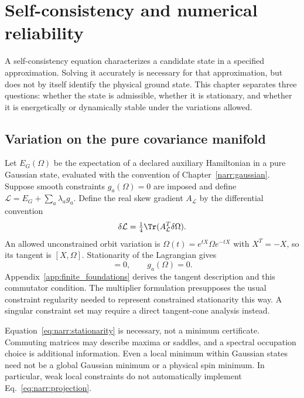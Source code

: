 \chapter{Self-consistency and numerical reliability}
\label{narr:variation}

A self-consistency equation characterizes a candidate state in a specified
approximation. Solving it accurately is necessary for that approximation, but
does not by itself identify the physical ground state. This chapter separates
three questions: whether the state is admissible, whether it is stationary, and
whether it is energetically or dynamically stable under the variations allowed.

\section{Variation on the pure covariance manifold}
Let $E_G(\Omega)$ be the expectation of a declared auxiliary Hamiltonian in a
pure Gaussian state, evaluated with the convention of Chapter~\ref{narr:gaussian}.
Suppose smooth constraints $g_a(\Omega)=0$ are imposed and define
$\mathcal L=E_G+\sum_a\lambda_ag_a$. Define the real skew gradient $A_{\mathcal L}$
by the differential convention
\begin{equation}
 \delta\mathcal L=\tfrac14\Tr(A_{\mathcal L}^T\delta\Omega).
 \label{eq:narr:gradient}
\end{equation}
An allowed unconstrained orbit variation is
$\Omega(t)=e^{tX}\Omega e^{-tX}$ with $X^T=-X$, so its tangent is $[X,\Omega]$.
Stationarity of the Lagrangian gives
\begin{equation}
 [A_{\mathcal L},\Omega]=0,\qquad g_a(\Omega)=0.
 \label{eq:narr:stationarity}
\end{equation}
Appendix~\ref{app:finite_foundations} derives the tangent description and this
commutator condition. The multiplier formulation presupposes the usual
constraint regularity needed to represent constrained stationarity this way.
A singular constraint set may require a direct tangent-cone analysis instead.

Equation~\eqref{eq:narr:stationarity} is necessary, not a minimum certificate.
Commuting matrices may describe maxima or saddles, and a spectral occupation
choice is additional information. Even a local minimum within Gaussian states
need not be a global Gaussian minimum or a physical spin minimum. In particular,
weak local constraints do not automatically implement Eq.~\eqref{eq:narr:projection}.

